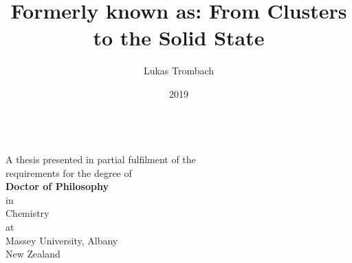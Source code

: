 
\author{Lukas Trombach}
\title{Formerly known as: From Clusters to the Solid State}
\date{2019}

\makeatletter
\begin{titlepage}
\begin{center}
\vspace*{10mm}
    \LARGE{\textbf{\@title
    }}\\\vspace{2cm}
    \large{
    A thesis presented in partial fulfilment of the \\ requirements for the degree of 
    }\\\vspace{2cm}
    \large{\textbf{
    Doctor of Philosophy
    }}\\
	\large{in \\ Chemistry}\\\vspace{2cm}
    \large{at \\ Massey University, Albany \\ New Zealand}\\\vspace{2cm}
    \large{\textbf{\@author}}\\\vspace{1.5cm}
    \large{\@date}
    
\end{center}
\end{titlepage}

